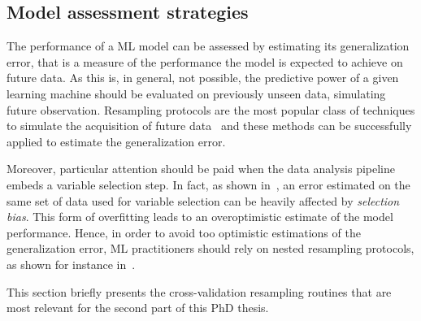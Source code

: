   \subsection{Model assessment strategies} \label{sec:model_evaluation}
  The performance of a ML model can be assessed by estimating its generalization error, that is a measure of the performance the model is expected to achieve on future data.
  As this is, in general, not possible, the predictive power of a given learning machine should be evaluated on previously unseen data, simulating future observation.
  Resampling protocols are the most popular class of techniques to simulate the acquisition of future data~\cite{molinaro2005prediction} and these methods can be successfully applied to estimate the generalization error.
  
  Moreover, particular attention should be paid when the data analysis pipeline embeds a variable selection step. In fact, as shown in~\cite{ambroise2002selection}, an error estimated on the same set of data used for variable selection can be heavily affected by \textit{selection bias}.
  This form of overfitting leads to an overoptimistic estimate of the model performance.
  Hence, in order to avoid too optimistic estimations of the generalization error, ML practitioners should rely on nested resampling protocols, as shown for instance in~\cite{de2009regularized}.
  
  This section briefly presents the cross-validation resampling routines that are most relevant for the second part of this PhD thesis.
  
